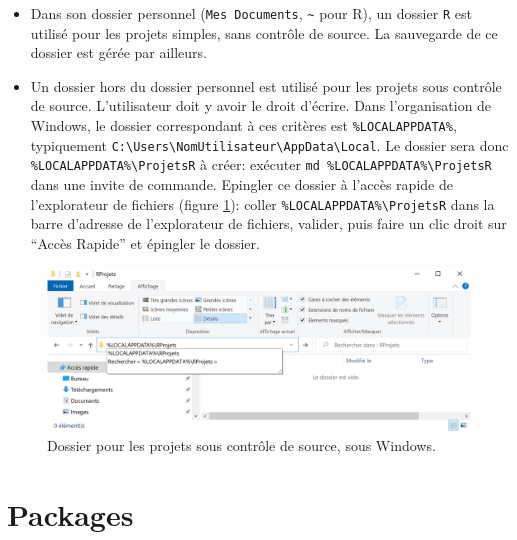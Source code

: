 \documentclass[
  11pt,
  french,
  a4paper,
  extrafontsizes,onecolumn,openright
  ]{memoir}
\providecommand{\tightlist}{%
  \setlength{\itemsep}{0pt}\setlength{\parskip}{0pt}}
\begin{document}
\begin{itemize}
\tightlist
\item
  Dans son dossier personnel (\texttt{Mes\ Documents}, \texttt{\textasciitilde{}} pour R), un dossier \texttt{R} est utilisé pour les projets simples, sans contrôle de source.
  La sauvegarde de ce dossier est gérée par ailleurs.
\item
  Un dossier hors du dossier personnel est utilisé pour les projets sous contrôle de source.
  L'utilisateur doit y avoir le droit d'écrire.
  Dans l'organisation de Windows, le dossier correspondant à ces critères est \texttt{\%LOCALAPPDATA\%}, typiquement \texttt{C:\textbackslash{}Users\textbackslash{}NomUtilisateur\textbackslash{}AppData\textbackslash{}Local}.
  Le dossier sera donc \texttt{\%LOCALAPPDATA\%\textbackslash{}ProjetsR} à créer: exécuter \texttt{md\ \%LOCALAPPDATA\%\textbackslash{}ProjetsR} dans une invite de commande.
  Epingler ce dossier à l'accès rapide de l'explorateur de fichiers (figure \ref{fig:R-ProjetsR}): coller \texttt{\%LOCALAPPDATA\%\textbackslash{}ProjetsR} dans la barre d'adresse de l'explorateur de fichiers, valider, puis faire un clic droit sur ``Accès Rapide'' et épingler le dossier.
\end{itemize}



\scriptsize

\begin{figure}

{\centering \includegraphics[width=1\linewidth]{images/R-ProjetsR} 

}

\caption{Dossier pour les projets sous contrôle de source, sous Windows.}\label{fig:R-ProjetsR}
\end{figure}

\normalsize

\hypertarget{packages}{%
\section{Packages}\label{packages}}
\end{document}
